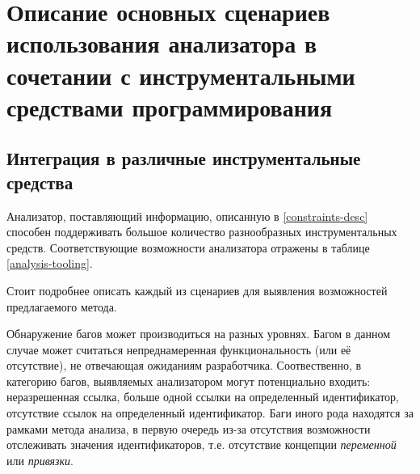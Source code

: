 \section{Описание основных сценариев использования анализатора в сочетании с
инструментальными средствами программирования}

\subsection{Интеграция в различные инструментальные средства}

Анализатор, поставляющий информацию, описанную в \ref{constraints-desc} способен
поддерживать большое количество разнообразных инструментальных средств. Соответствующие
возможности анализатора отражены в таблице \ref{analysis-tooling}.

\begin{table}[h]
    \caption{Поддержка анализатором различных сценариев использования инструментальных средств}
    \label{analysis-tooling}
\end{table}

Стоит подробнее описать каждый из сценариев для выявления возможностей предлагаемого метода.

Обнаружение багов может производиться на разных уровнях. Багом в данном случае может
считаться непреднамеренная функциональность (или её отсутствие), не отвечающая ожиданиям разработчика.
Соотвественно, в категорию багов, выявляемых анализатором могут потенциально входить:
неразрешенная ссылка, больше одной ссылки на определенный идентификатор, отсутствие ссылок
на определенный идентификатор. Баги иного рода находятся за рамками метода анализа, в первую
очередь из-за отсутствия возможности отслеживать значения идентификаторов, т.е.
отсутствие концепции \textit{переменной} или \textit{привязки}.

